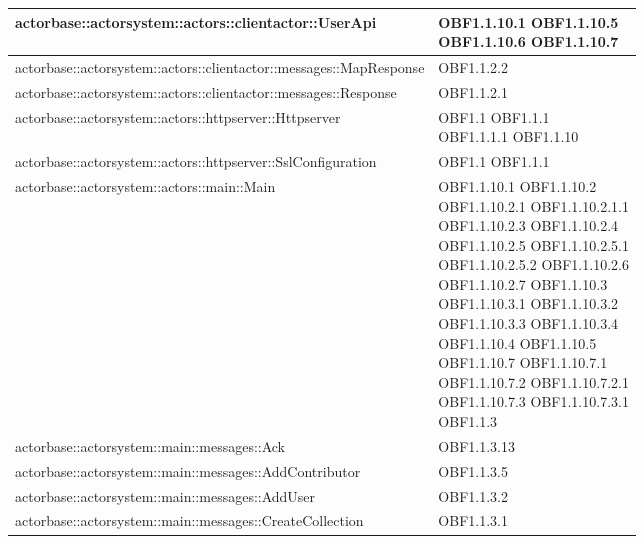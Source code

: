 \documentclass{scalatekids-article}
\begin{document}
\begin{longtable}[H]{|p{12cm}|p{5.5cm}|}
  \hline
  actorbase::actorsystem::actors::clientactor::UserApi & \multiLineCell[t]{OBF1.1.10.1 OBF1.1.10.5\\OBF1.1.10.6 OBF1.1.10.7\\}\\
  \hline
  actorbase::actorsystem::actors::clientactor::messages::MapResponse & \multiLineCell[t]{OBF1.1.2.2\\}\\
  \hline
  actorbase::actorsystem::actors::clientactor::messages::Response & \multiLineCell[t]{OBF1.1.2.1\\}\\
  \hline
  actorbase::actorsystem::actors::httpserver::Httpserver & \multiLineCell[t]{OBF1.1 OBF1.1.1\\OBF1.1.1.1 OBF1.1.10\\}\\
  \hline
  actorbase::actorsystem::actors::httpserver::SslConfiguration & \multiLineCell[t]{OBF1.1 OBF1.1.1\\}\\
  \hline
  actorbase::actorsystem::actors::main::Main & \multiLineCell[t]{OBF1.1.10.1 OBF1.1.10.2\\OBF1.1.10.2.1 OBF1.1.10.2.1.1\\OBF1.1.10.2.3 OBF1.1.10.2.4\\OBF1.1.10.2.5 OBF1.1.10.2.5.1\\OBF1.1.10.2.5.2 OBF1.1.10.2.6\\OBF1.1.10.2.7 OBF1.1.10.3\\OBF1.1.10.3.1 OBF1.1.10.3.2\\OBF1.1.10.3.3 OBF1.1.10.3.4\\OBF1.1.10.4 OBF1.1.10.5\\OBF1.1.10.7 OBF1.1.10.7.1\\OBF1.1.10.7.2 OBF1.1.10.7.2.1\\OBF1.1.10.7.3 OBF1.1.10.7.3.1\\OBF1.1.3}\\
  \hline
  actorbase::actorsystem::main::messages::Ack & \multiLineCell[t]{OBF1.1.3.13\\}\\
  \hline
  actorbase::actorsystem::main::messages::AddContributor & \multiLineCell[t]{OBF1.1.3.5\\}\\
  \hline
  actorbase::actorsystem::main::messages::AddUser & \multiLineCell[t]{OBF1.1.3.2\\}\\
  \hline
  actorbase::actorsystem::main::messages::CreateCollection & \multiLineCell[t]{OBF1.1.3.1\\}\\

\end{longtable}
\end{document}
